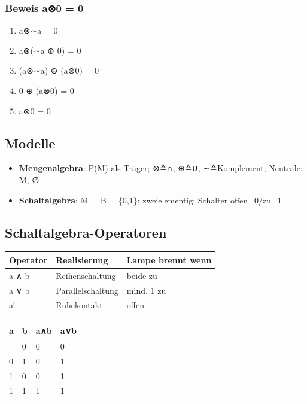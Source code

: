 \documentclass[11pt, a4paper]{article}
\begin{document}
\subsubsection{Beweis a⊗0 = 0}
\begin{enumerate}
  \item a⊗∼a = 0
  \item a⊗(∼a ⊕ 0) = 0
  \item (a⊗∼a) ⊕ (a⊗0) = 0
  \item 0 ⊕ (a⊗0) = 0
  \item a⊗0 = 0
\end{enumerate}


\subsection{Modelle}

\begin{itemize}
  \item \textbf{Mengenalgebra}: P(M) als Träger; ⊗≙∩, ⊕≙∪, ∼≙Komplement; Neutrale: M, ∅
  \item \textbf{Schaltalgebra}: M = B = \{0,1\}; zweielementig; Schalter offen=0/zu=1
\end{itemize}


\subsection{Schaltalgebra-Operatoren}


{\small
\begin{tabularx}{\linewidth}{XXX}
\hline
\rowcolor{tableheadbg}
{\color{white}\textbf{Operator}} & {\color{white}\textbf{Realisierung}} & {\color{white}\textbf{Lampe brennt wenn}} \\[2pt]
\hline
\endhead
\hline
\endfoot
a ∧ b & Reihenschaltung & beide zu \\
a ∨ b & Parallelschaltung & mind. 1 zu \\
a′ & Ruhekontakt & offen \\
\end{tabularx}
}



{\small
\begin{tabularx}{\linewidth}{XXXX}
\hline
\rowcolor{tableheadbg}
{\color{white}\textbf{a}} & {\color{white}\textbf{b}} & {\color{white}\textbf{a∧b}} & {\color{white}\textbf{a∨b}} \\[2pt]
\hline
\endhead
\hline
\endfoot
0 & 0 & 0 & 0 \\
0 & 1 & 0 & 1 \\
1 & 0 & 0 & 1 \\
1 & 1 & 1 & 1 \\
\end{tabularx}
}
\end{document}
